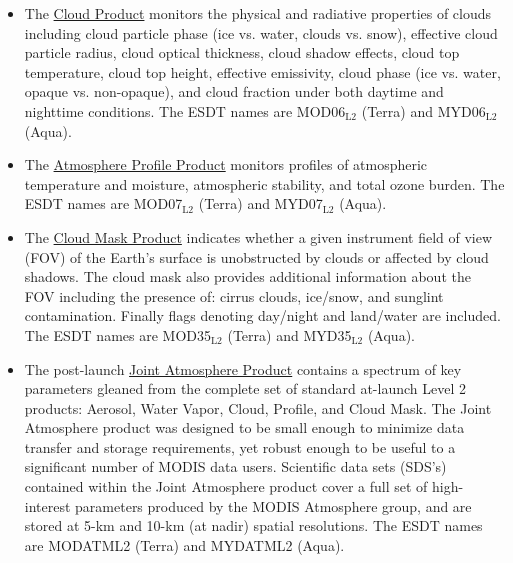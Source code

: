 \documentclass[11pt]{article}
\begin{document}
\begin{itemize}
\item The \href{http://modis-atmos.gsfc.nasa.gov/MOD06_L2/index.html}{Cloud Product} monitors the physical and radiative properties
of clouds including cloud particle phase (ice vs. water, clouds
vs. snow), effective cloud particle radius, cloud optical
thickness, cloud shadow effects, cloud top temperature, cloud
top height, effective emissivity, cloud phase (ice vs. water,
opaque vs. non-opaque), and cloud fraction under both daytime
and nighttime conditions. The ESDT names are MOD06$_{\text{L2}}$ (Terra)
and MYD06$_{\text{L2}}$ (Aqua).
\end{itemize}


\begin{itemize}
\item The \href{http://modis-atmos.gsfc.nasa.gov/MOD07_L2/index.html}{Atmosphere Profile Product} monitors profiles of atmospheric
temperature and moisture, atmospheric stability, and total ozone
burden. The ESDT names are MOD07$_{\text{L2}}$ (Terra) and MYD07$_{\text{L2}}$ (Aqua).
\end{itemize}


\begin{itemize}
\item The \href{http://modis-atmos.gsfc.nasa.gov/MOD35_L2/index.html}{Cloud Mask Product} indicates whether a given instrument
field of view (FOV) of the Earth's surface is unobstructed by
clouds or affected by cloud shadows. The cloud mask also
provides additional information about the FOV including the
presence of: cirrus clouds, ice/snow, and sunglint
contamination. Finally flags denoting day/night and land/water
are included. The ESDT names are MOD35$_{\text{L2}}$ (Terra) and MYD35$_{\text{L2}}$ (Aqua).
\end{itemize}


\begin{itemize}
\item The post-launch \href{http://modis-atmos.gsfc.nasa.gov/JOINT/index.html}{Joint Atmosphere Product} contains a spectrum of
key parameters gleaned from the complete set of standard
at-launch Level 2 products: Aerosol, Water Vapor, Cloud,
Profile, and Cloud Mask. The Joint Atmosphere product was
designed to be small enough to minimize data transfer and
storage requirements, yet robust enough to be useful to a
significant number of MODIS data users. Scientific data sets
(SDS's) contained within the Joint Atmosphere product cover a
full set of high-interest parameters produced by the MODIS
Atmosphere group, and are stored at 5-km and 10-km (at nadir)
spatial resolutions. The ESDT names are MODATML2 (Terra) and
MYDATML2 (Aqua).
\end{itemize}
\end{document}
